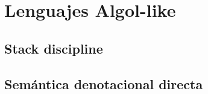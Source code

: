 \chapter{Lenguajes Algol-like}
\label{chap:algollike}

\section{Stack discipline}

\section{Sem\'antica denotacional directa}
